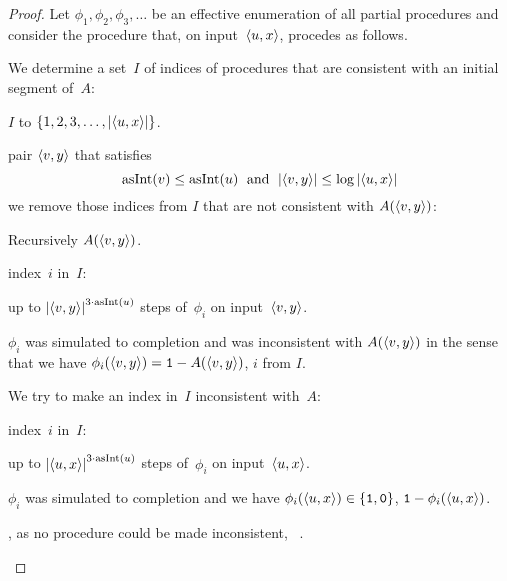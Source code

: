 \begin{proof}
  Let $\phi_1, \phi_2, \phi_3, \ldots$ be an effective enumeration of all partial procedures and consider the procedure that, on input~${\langle u, x\rangle}$, procedes as follows.
  \begin{codelisting}
  \item
    We determine a set~$I$ of indices of procedures that are consistent with an initial segment of~$A$:
    \begin{codelisting}
    \item
       $I$ to $\{1, 2, 3, \ldots, \length{\pair{u}{x}}\}$.
    \item
       pair $\pair{v}{y}$ that satisfies
      \begin{equation*}
        \asNat(v) \le \asNat(u) \reland \length{\pair{v}{y}} \le \log \length{\pair{u}{x}}
      \end{equation*}
      we remove those indices from $I$ that are not consistent with $A(\pair{v}{y})$:
      \begin{codelisting}
      \item
        Recursively  $A(\pair{v}{y})$.
      \item
         index~$i$ in~$I$:
        \begin{codelisting}
        \item
           up to $\length{\pair{v}{y}}^{3 \cdot \asNat(u)}$ steps of~$\phi_i$ on input~$\pair{v}{y}$.
        \item
           $\phi_i$ was simulated to completion and was inconsistent with $A(\pair{v}{y})$ in the sense that we have $\phi_i(\pair{v}{y}) = \bits{1} - A(\pair{v}{y})$,
          \itemcont {} $i$ from $I$.
        \end{codelisting}
      \end{codelisting}
    \end{codelisting}
  \item
    We try to make an index in~$I$ inconsistent with~$A$:
    \begin{codelisting}
    \item
       index~$i$ in~$I$:
      \begin{codelisting}
      \item
         up to $\length{\pair{u}{x}}^{3 \cdot \asNat(u)}$ steps of~$\phi_i$ on input~$\pair{u}{x}$.
      \item
         $\phi_i$ was simulated to completion and we have $\phi_i(\pair{u}{x}) \in \{\bits{1}, \bits{0}\}$,
        \itemcont {} $\bits{1} - \phi_i(\pair{u}{x})$.
      \end{codelisting}
    \item
      , as no procedure could be made inconsistent, ~.
    \end{codelisting}
  \end{codelisting}


\end{proof}
